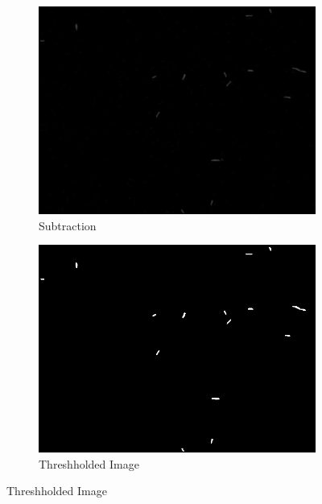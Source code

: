 \documentclass{article}
\begin{document}
\renewcommand\thesubfigure{\roman{subfigure}}
\begin{figure}
    \centering
    \begin{subfigure}[b]{.45\linewidth}
    \includegraphics[width=\linewidth]{subtraction.jpg}
    \caption{Subtraction}\label{fig:subtraction}
    \end{subfigure}
    \begin{subfigure}[b]{.45\linewidth}
    \includegraphics[width=\linewidth]{threshold.jpg}
    \caption{Threshholded Image}\label{fig:threshold}
    \end{subfigure}


\end{figure}
\end{document}
